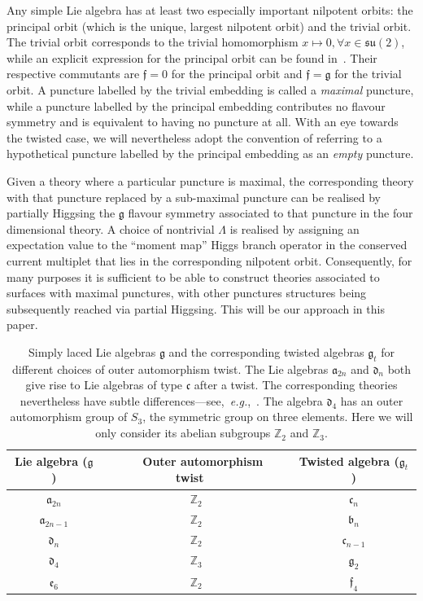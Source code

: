 \documentclass[a4paper]{article}
\def\IZ{\mathbb{Z}}
\def\suf{\mathfrak{su}}
\def\af{\mathfrak{a}}
\def\bbf{\mathfrak{b}}
\def\ccf{\mathfrak{c}}
\def\df{\mathfrak{d}}
\def\ef{\mathfrak{e}}
\def\gf{\mathfrak{g}}
\def \ff{\mathfrak{f}}
\def \eg{{\it e.g.}}
\begin{document}
Any simple Lie algebra has at least two especially important nilpotent orbits: the principal orbit (which is the unique, largest nilpotent orbit) and the trivial orbit. The trivial orbit corresponds to the trivial homomorphism $x\mapsto0, \forall x\in\suf(2)$, while an explicit expression for the principal orbit can be found in~\cite{Collingwood:1993}. Their respective commutants are $\mathfrak{f}=0$ for the principal orbit and $\mathfrak{f}=\gf$ for the trivial orbit. A puncture labelled by the trivial embedding is called a \textit{maximal} puncture, while a puncture labelled by the principal embedding contributes no flavour symmetry and is equivalent to having no puncture at all. With an eye towards the twisted case, we will nevertheless adopt the convention of referring to a hypothetical puncture labelled by the principal embedding as an \textit{empty} puncture.

Given a theory where a particular puncture is maximal, the corresponding theory with that puncture replaced by a sub-maximal puncture can be realised by partially Higgsing the $\gf$ flavour symmetry associated to that puncture in the four dimensional theory. A choice of nontrivial $\Lambda$ is realised by assigning an expectation value to the ``moment map'' Higgs branch operator in the conserved current multiplet that lies in the corresponding nilpotent orbit. Consequently, for many purposes it is sufficient to be able to construct theories associated to surfaces with maximal punctures, with other punctures structures being subsequently reached via partial Higgsing. This will be our approach in this paper.

\begin{table}[!t]
\centering
\begin{tabular}{c|c|c}
    Lie algebra ($\gf$) & ~~Outer automorphism twist~~ & Twisted algebra ($\gf_t$)\\
    \hline
    $\af_{2n}$ & $\IZ_2$ & $\ccf_n$ \\
    $\af_{2n-1}$ & $\IZ_2$ & $\bbf_n$ \\
    $\df_{n}$ & $\IZ_2$ &  $\ccf_{n-1} $ \\
    $\df_4$ & $\IZ_3$ & $\gf_2$ \\
    $\ef_6$ & $\IZ_2$ & $\ff_4$ \\
\end{tabular}
\caption{Simply laced Lie algebras $\gf$ and the corresponding twisted algebras $\gf_t$ for different choices of outer automorphism twist. The Lie algebras $\af_{2n}$ and $\df_{n}$ both give rise to Lie algebras of type $\ccf$ after a twist. The corresponding theories nevertheless have subtle differences---see,~\eg,~\cite{Chacaltana:2014nya,Beem:2020pry}. The algebra $\mathfrak{d}_4$ has an outer automorphism group of $S_3$, the symmetric group on three elements. Here we will only consider its abelian subgroups $\IZ_2$ and $\IZ_3$.}
\label{tab:outer_aut}%
\end{table}
\end{document}
